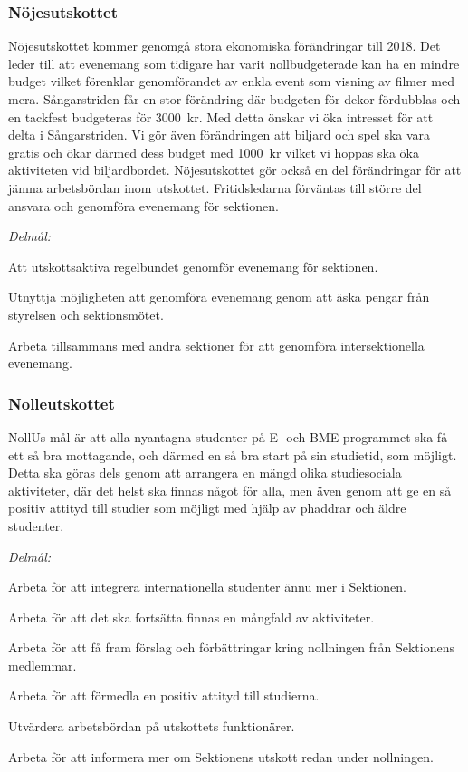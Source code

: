 \documentclass[../_main/handlingar.tex]{subfiles}
\begin{document}
\subsubsection*{Nöjesutskottet}
Nöjesutskottet kommer genomgå stora ekonomiska förändringar till 2018. Det leder till att evenemang som tidigare har varit nollbudgeterade kan ha en mindre budget vilket förenklar genomförandet av enkla event som visning av filmer med mera. Sångarstriden får en stor förändring där budgeten för dekor fördubblas och en tackfest budgeteras för \SI{3000}{kr}. Med detta önskar vi öka intresset för att delta i Sångarstriden. Vi gör även förändringen att biljard och spel ska vara gratis och ökar därmed dess budget med \SI{1000}{kr} vilket vi hoppas ska öka aktiviteten vid biljardbordet. Nöjesutskottet gör också en del förändringar för att jämna arbetsbördan inom utskottet. Fritidsledarna förväntas till större del ansvara och genomföra evenemang för sektionen.

\emph{Delmål:}
\begin{dashlist}
	\item Att utskottsaktiva regelbundet genomför evenemang för sektionen.
	\item Utnyttja möjligheten att genomföra evenemang genom att äska pengar från styrelsen och sektionsmötet.
	\item Arbeta tillsammans med andra sektioner för att genomföra intersektionella evenemang.
\end{dashlist}

\newpage

\subsubsection*{Nolleutskottet}
NollUs mål är att alla nyantagna studenter på E- och BME-programmet ska få ett så bra mottagande, och därmed en så bra start på sin studietid, som möjligt. Detta ska göras dels genom att arrangera en mängd olika studiesociala aktiviteter, där det helst ska finnas något för alla, men även genom att ge en så positiv attityd till studier som möjligt med hjälp av phaddrar och äldre studenter.

\emph{Delmål:}
\begin{dashlist}
	\item Arbeta för att integrera internationella studenter ännu mer i Sektionen.
	\item Arbeta för att det ska fortsätta finnas en mångfald av aktiviteter.
	\item Arbeta för att få fram förslag och förbättringar kring nollningen från Sektionens medlemmar.
	\item Arbeta för att förmedla en positiv attityd till studierna.
	\item Utvärdera arbetsbördan på utskottets funktionärer.
	\item Arbeta för att informera mer om Sektionens utskott redan under nollningen.
\end{dashlist}
\end{document}
